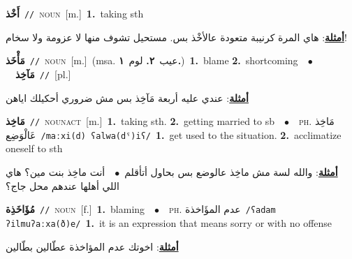 \documentclass[10pt,a4paper,twoside]{article} %
\begin{document}
\begin{multicols}{2}
{{{{{{\setlength\topsep{0pt}\textbf{\foreignlanguage{arabic}{أَخْذ}}\ {\color{gray}\texttt{//}\color{black}}\ \textsc{noun}\ [m.]\ \textbf{1.}~taking sth\  \begin{flushright}\color{gray}\foreignlanguage{arabic}{\textbf{\underline{\foreignlanguage{arabic}{أمثلة}}}: هاي المرة كرنيبة متعودة عالأخْذ بس. مستحيل تشوف منها لا عزومة ولا سخام!}\end{flushright}\color{black}} \vspace{2mm}

{\setlength\topsep{0pt}\textbf{\foreignlanguage{arabic}{مَأْخَذ}}\ {\color{gray}\texttt{//}\color{black}}\ \textsc{noun}\ [m.]\ \color{gray}(msa. \foreignlanguage{arabic}{عيب}~\foreignlanguage{arabic}{\textbf{٢.}}  \foreignlanguage{arabic}{لوم}~\foreignlanguage{arabic}{\textbf{١.}})\color{black}\ \textbf{1.}~blame  \textbf{2.}~shortcoming\ \ $\bullet$\ \ \setlength\topsep{0pt}\textbf{\foreignlanguage{arabic}{مَآخِذ}}\ {\color{gray}\texttt{//}\color{black}}\ [pl.]\  \begin{flushright}\color{gray}\foreignlanguage{arabic}{\textbf{\underline{\foreignlanguage{arabic}{أمثلة}}}: عندي عليه أربعة مَآخِذ بس مش ضروري أحكيلك اياهن}\end{flushright}\color{black}} \vspace{2mm}

{\setlength\topsep{0pt}\textbf{\foreignlanguage{arabic}{مَاخِذ}}\ {\color{gray}\texttt{//}\color{black}}\ \textsc{noun\textunderscore act}\ [m.]\ \textbf{1.}~taking sth.  \textbf{2.}~getting married to sb\ \ $\bullet$\ \ \textsc{ph.} \color{gray} \foreignlanguage{arabic}{مَاخِذ عَالْوَضِع}\color{black}\ {\color{gray}\texttt{/{\sffamily maːxi(d) ʕalwa(dˤ)iʕ}/}\color{black}}\ \textbf{1.}~get used to the situation.  \textbf{2.}~acclimatize oneself to sth\  \begin{flushright}\color{gray}\foreignlanguage{arabic}{\textbf{\underline{\foreignlanguage{arabic}{أمثلة}}}: والله لسة مش ماخِذ عالوضع بس بحاول أتأقلم\ $\bullet$\ \  أنت ماخِذ بنت مين؟ هاي اللي أهلها عندهم محل جاج؟}\end{flushright}\color{black}} \vspace{2mm}

{\setlength\topsep{0pt}\textbf{\foreignlanguage{arabic}{مُؤَاخَذِة}}\ {\color{gray}\texttt{//}\color{black}}\ \textsc{noun}\ [f.]\ \textbf{1.}~blaming\ \ $\bullet$\ \ \textsc{ph.} \color{gray} \foreignlanguage{arabic}{عدم المؤَاخذة}\color{black}\ {\color{gray}\texttt{/{\sffamily ʕadam ʔilmuʔaːxa(ð)e}/}\color{black}}\ \textbf{1.}~it is an expression that means sorry or with no offense\  \begin{flushright}\color{gray}\foreignlanguage{arabic}{\textbf{\underline{\foreignlanguage{arabic}{أمثلة}}}: اخوتك عدم المؤاخذة عطّالين بطّالين}\end{flushright}\color{black}} \vspace{2mm}

}}}}}
\end{multicols}
\end{document}
